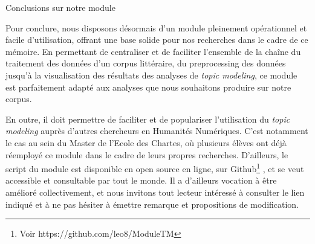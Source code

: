 \documentclass[letterpaper,portrait,12pt]{article}
\begin{document}
	Conclusions sur notre module





\textbf{	}Pour conclure, nous disposons d\'{e}sormais d'un module pleinement op\'{e}rationnel et facile d'utilisation, offrant une base solide pour nos recherches dans le cadre de ce m\'{e}moire. En permettant de centraliser et de faciliter l'ensemble de la cha\^{i}ne du traitement des donn\'{e}es d'un corpus litt\'{e}raire, du preprocessing des donn\'{e}es jusqu'\`{a} la visualisation des r\'{e}sultats des analyses de \emph{topic modeling}, ce module est parfaitement adapt\'{e} aux analyses que nous souhaitons produire sur notre corpus. 





	En outre, il doit permettre de faciliter et de populariser l'utilisation du \emph{topic modeling} aupr\`{e}s d'autres chercheurs en Humanit\'{e}s Num\'{e}riques. C'est notamment le cas au sein du Master de l'Ecole des Chartes, où plusieurs \'{e}l\`{e}ves ont d\'{e}j\`{a} r\'{e}employ\'{e} ce module dans le cadre de leurs propres recherches. D'ailleurs, le script du module est disponible en open source en ligne, sur Github\footnote{	Voir https://github.com/leo8/ModuleTM} , et se veut accessible et consultable par tout le monde. Il a d'ailleurs vocation \`{a} \^{e}tre am\'{e}lior\'{e} collectivement, et nous invitons tout lecteur int\'{e}ress\'{e} \`{a} consulter le lien indiqu\'{e} et \`{a} ne pas h\'{e}siter \`{a} \'{e}mettre remarque et propositions de modification.
\end{document}
